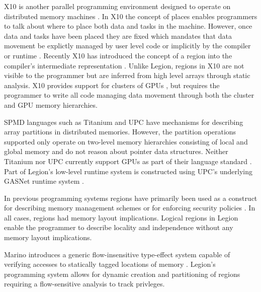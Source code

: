 X10 is another parallel programming environment designed to operate on distributed
memory machines \cite{X1005}.  In X10 the concept of places enables programmers to talk about where
to place both data and tasks in the machine.  However, once data and tasks have
been placed they are fixed which mandates that data movement be explictly managed by
user level code or implicitly by the compiler or runtime \cite{X1008}.  Recently X10 has introduced
the concept of a region into the compiler's intermediate representation \cite{X1011}.
Unlike Legion, regions in X10 are not visible to the programmer but are inferred
from high level arrays through static analysis.  X10 provides support for clusters of GPUs
\cite{X10GPU}, but requires the programmer to write all code managing data movement
through both the cluster and GPU memory hierarchies.

SPMD languages such as Titanium \cite{TIT98} and UPC \cite{UPC99} have mechanisms for
describing array partitions in distributed memories.  However, the partition
operations supported only operate on two-level memory hierarchies consisting of local
and global memory and do not reason about pointer data structures.  Neither Titanium
nor UPC currently support GPUs as part of their language standard \cite{TITANIUMSTANDARD}
\cite{UPCSTANDARD}.  Part of Legion's 
low-level runtime system is constructed using UPC's underlying GASNet 
runtime system \cite{GASNET07}. 

In previous programming systems regions have primarily been used as a construct for
describing memory management schemes \cite{REAPS02}\cite{RC01}  
or for enforcing security policies \cite{CYCLONE01}.  In all cases, regions had
memory layout implications.  Logical regions in Legion enable the programmer to
describe locality and independence without any memory layout implications.

Marino introduces a generic flow-insensitive type-effect system capable of verifying 
accesses to statically tagged locations of memory \cite{PRIVLIGES09}.  Legion's programming
system allows for dynamic creation and partitioning of regions requiring a 
flow-sensitive analysis to track privleges.
